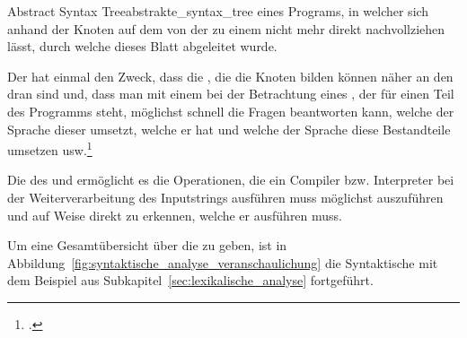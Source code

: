 \begin{Definition}{Abstract Syntax Tree}{abstrakte_syntax_tree}
   eines Programs, in welcher sich anhand der Knoten auf dem  von der  zu einem  nicht mehr direkt nachvollziehen lässt, durch welche  dieses Blatt abgeleitet wurde.

Der  hat einmal den Zweck, dass die , die die Knoten bilden können  näher an den  dran sind und, dass man mit einem  bei der Betrachtung eines , der für einen Teil des Programms steht, möglichst schnell die Fragen beantworten kann, welche  der Sprache dieser umsetzt, welche  er hat und welche  der Sprache diese Bestandteile umsetzen usw.\footcite{noauthor_course_2022}
\end{Definition}

Die  des  und  ermöglicht es die Operationen, die ein Compiler bzw. Interpreter bei der Weiterverarbeitung des Inputstrings ausführen muss möglichst  auszuführen und auf  Weise direkt zu erkennen, welche er ausführen muss.


Um eine Gesamtübersicht über die  zu geben, ist in Abbildung~\ref{fig:syntaktische_analyse_veranschaulichung} die Syntaktische mit dem Beispiel aus Subkapitel~\ref{sec:lexikalische_analyse} fortgeführt.

